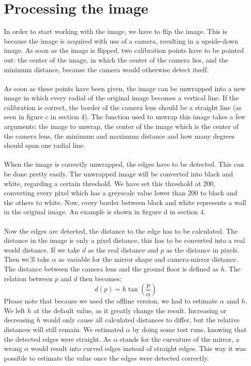 \documentclass[12pt]{article}
\begin{document}
\section{Processing the image}
In order to start working with the image, we have to flip the image. This is because the image is acquired with use of a camera, resulting in a upside-down image. As soon as the image is flipped, two calibration points have to be pointed out: the center of the image, in which the center of the camera lies, and the minimum distance, because the camera would otherwise detect itself. \\ \\
As soon as these points have been given, the image can be unwrapped into a new image in which every radial of the original image becomes a vertical line. If the calibration is correct, the border of the camera lens should be a straight line (as seen in figure c in section 4). The function used to unwrap this image takes a few arguments: the image to unwrap, the center of the image which is the center of the camera lens, the minimum and maximum distance and how many degrees should span one radial line. \\ \\
When the image is correctly unwrapped, the edges have to be detected. This can be done pretty easily. The unwrapped image will be converted into black and white, regarding a certain threshold. We have set this threshold at 200, converting every pixel which has a greyscale value lower than 200 to black and the others to white. Now, every border between black and white represents a wall in the original image. An example is shown in firgure d in section 4. \\ \\
Now the edges are detected, the distance to the edge has to be calculated. The distance in the image is only a pixel distance, this has to be converted into a real world distance. If we take $d$ as the real distance and $p$ as the distance in pixels. Then we'll take $\alpha$ as variable for the mirror shape and camera-mirror distance. The distance between the camera lens and the ground floor is defined as $h$. The relation between $p$ and $d$ then becomes:
\begin{equation}
	d(p) = h \tan{(\frac{p}{\alpha})}
\end{equation}
Please note that because we used the offline version, we had to estimate $\alpha$ amd $h$. We left $h$ at the default value, as it greatly change the result. Increasing or decreasing $h$ would only cause all calculated distances to differ, but the relative distances will still remain. We estimated $\alpha$ by doing some test runs, knowing that the detected edges were straight. As $\alpha$ stands for the curvature of the mirror, a wrong $\alpha$ would result into curved edges instead of straight edges. This way it was possible to estimate the value once the edges were detected correctly. \\ \\
\end{document}
